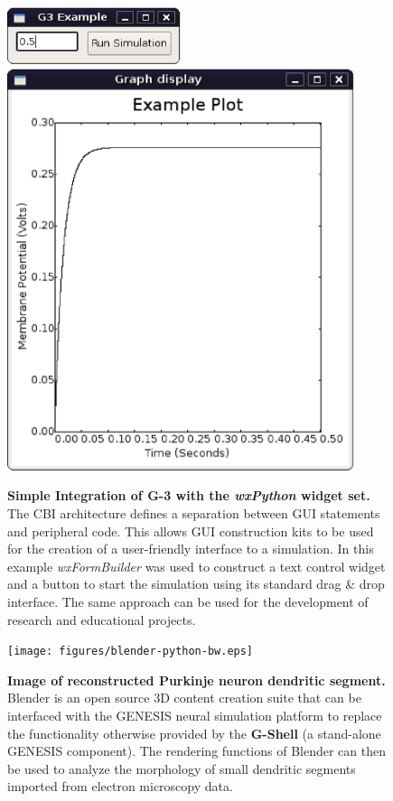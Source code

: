 \documentclass[10pt]{article}
\begin{document}
\clearpage

\begin{figure}[ht]
\begin{center}
\includegraphics[width=2in]{figures/Screenshot-G3-Example.eps}
\includegraphics[width=4in]{figures/Screenshot-Graph-display.eps}
\end{center}
\caption{ {\bf Simple Integration of G-3 with the {\it wxPython}
    widget set.}  The CBI architecture defines a separation between
  GUI statements and peripheral code.  This allows GUI construction
  kits to be used for the creation of a user-friendly interface to a
  simulation.  In this example {\it wxFormBuilder} was used to
  construct a text control widget and a button to start the simulation
  using its standard drag \& drop interface.  The same approach can be
  used for the development of research and educational projects.  }
\label{fig:g3-wx}
\end{figure}

\clearpage

\begin{figure}[ht]
\begin{center}
\texttt{[image: figures/blender-python-bw.eps]}
\end{center}
\caption{
{\bf Image of reconstructed Purkinje neuron dendritic segment.} Blender is an open source 3D content creation suite that can be interfaced with the GENESIS neural simulation platform to replace the functionality otherwise provided by the {\bf G-Shell} (a stand-alone GENESIS component). The rendering functions of Blender can then be used to analyze the morphology of small dendritic segments imported from electron microscopy data.
}
\label{fig:cbi-blender}
\end{figure}
\end{document}
